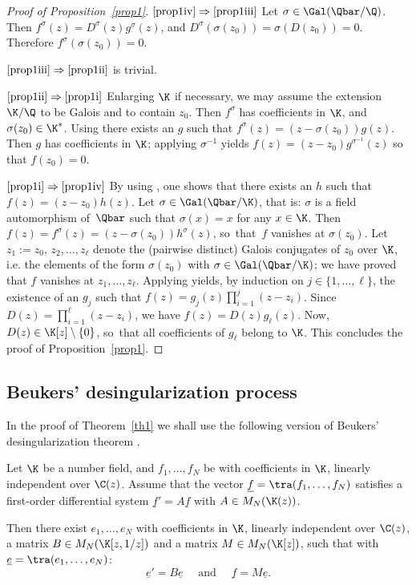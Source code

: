 \skpt
\begin{proof}[Proof of Proposition~\ref{prop1}]
$\eqref{prop1iv}\Rightarrow \eqref{prop1iii}$ Let $\sigma \in\Gal(\Qbar/\Q)$. Then $f^\sigma(z) =D^\sigma(z) g^\sigma(z) $, and $D^\sigma(\sigma(z_0))=\sigma(D(z_0))=0$. Therefore $f^\sigma(\sigma(z_0))=0$.

$\eqref{prop1iii}\Rightarrow \eqref{prop1ii}$ is trivial.

$\eqref{prop1ii}\Rightarrow \eqref{prop1i}$ Enlarging $\K$ if necessary, we may assume the extension $\K/\Q$ to be Galois and to contain $z_0$. Then $f^\sigma$ has coefficients in $\K$, and $\sigma(z_0)\in\K^\ast$. Using \cite[Prop.\,4.1]{beukers} there exists an \Efunction $g$ such that $f^\sigma(z) = (z-\sigma(z_0))g(z)$. Then $g$ has coefficients in $\K$; applying $\sigma^{-1}$ yields $f(z) = (z-z_0)g^{\sigma^{-1}}(z)$ so that $f(z_0)=0$.

$\eqref{prop1i}\Rightarrow \eqref{prop1iv}$ By using \cite[Prop.\,4.1]{beukers}, one shows that there exists an \Efunction $h$ such that $f (z) = (z- z_0 )h(z)$. Let $\sigma \in\Gal(\Qbar/\K)$, that is: $\sigma$ is a field automorphism of~$\Qbar$ such that $\sigma(x)=x $ for any $x\in \K$. Then $f(z) = f^\sigma(z) = (z-\sigma(z_0))h^\sigma(z)$, so~that~$f$ vanishes at $\sigma(z_0)$. Let $z_1:=z_0$, $z_2,\ldots,z_\ell$ denote the (pairwise distinct) Galois conjugates of $z_0$ over $\K$, i.e. the elements of the form $\sigma(z_0)$ with $\sigma \in\Gal(\Qbar/\K)$; we have proved that $f$ vanishes at $z_1,\ldots,z_\ell$. Applying \cite[Prop.\,4.1]{beukers} yields, by induction on $j\in\{1,\ldots, \ell\}$, the existence of an \Efunction $g_j$ such that $f (z) = g_j(z) \prod_{i=1}^j (z-z_i)$. Since $D(z) = \prod_{i=1}^\ell (z-z_i)$, we have $f(z) = D(z) g_\ell(z)$. Now, $D(z)\in\K[z]\setminus\{0\}$, so~that all coefficients of $g_\ell$ belong to $\K$. This concludes the proof of Proposition~\ref{prop1}.
\end{proof}

\subsection{Beukers' desingularization process}

In the proof of Theorem~\ref{th1} we shall use the following version of Beukers' desingularization theorem \cite[Th.\,1.5]{beukers}.

\begin{prop}\label{prop2}
Let $\K$ be a number field, and $f_1,\ldots,f_N$ be \Efunctions with coefficients in $\K$, linearly independent over $\C(z)$. Assume that the vector $\underline f = \tra (f_1,\ldots,f_N)$ satisfies a first-order differential system $\underline f '=A\underline f $ with $A\in M_N(\K(z))$.

Then there exist \Efunctions $e_1,\ldots,e_N$ with coefficients in $\K$, linearly independent over $\C(z)$, a matrix $B\in M_N(\K[z,1/z])$ and a matrix $M\in M_N(\K[z ])$, such that with $\underline e = \tra (e_1,\ldots,e_N)$:
\[
\underline e '=B\underline e\quad \mbox{ and }\quad \underline f = M \underline e.
\]
\end{prop}

